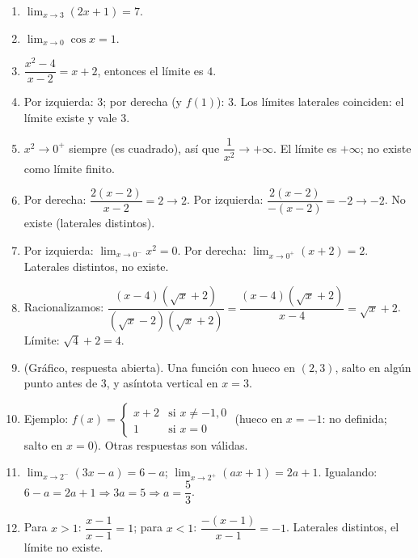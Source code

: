 \documentclass[12pt, a4paper]{article}
\begin{document}
\begin{enumerate}[leftmargin=*, label=\textbf{\arabic*.}]
  \item $\lim_{x \to 3} (2x + 1) = 7$.

  \item $\lim_{x \to 0} \cos x = 1$.

  \item $\dfrac{x^2 - 4}{x - 2} = x + 2$, entonces el límite es $4$.

  \item Por izquierda: $3$; por derecha (y $f(1)$): $3$. Los límites laterales coinciden: el límite existe y vale 3.

  \item $x^2 \to 0^+$ siempre (es cuadrado), así que $\dfrac{1}{x^2} \to +\infty$. El límite es $+\infty$; no existe como límite finito.

  \item Por derecha: $\dfrac{2(x-2)}{x-2} = 2 \to 2$. Por izquierda: $\dfrac{2(x-2)}{-(x-2)} = -2 \to -2$. No existe (laterales distintos).

  \item Por izquierda: $\lim_{x \to 0^-} x^2 = 0$. Por derecha: $\lim_{x \to 0^+} (x + 2) = 2$. Laterales distintos, no existe.

  \item Racionalizamos: $\dfrac{(x - 4)(\sqrt{x} + 2)}{(\sqrt{x} - 2)(\sqrt{x} + 2)} = \dfrac{(x-4)(\sqrt{x}+2)}{x - 4} = \sqrt{x} + 2$. Límite: $\sqrt{4} + 2 = 4$.

  \item (Gráfico, respuesta abierta). Una función con hueco en $(2,3)$, salto en algún punto antes de 3, y asíntota vertical en $x = 3$.

  \item Ejemplo: $f(x) = \begin{cases} x + 2 & \text{si } x \neq -1, 0 \\ 1 & \text{si } x = 0 \end{cases}$ (hueco en $x = -1$: no definida; salto en $x = 0$). Otras respuestas son válidas.

  \item $\lim_{x \to 2^-} (3x - a) = 6 - a$; $\lim_{x \to 2^+} (ax + 1) = 2a + 1$. Igualando: $6 - a = 2a + 1 \Rightarrow 3a = 5 \Rightarrow a = \dfrac{5}{3}$.

  \item Para $x > 1$: $\dfrac{x-1}{x-1} = 1$; para $x < 1$: $\dfrac{-(x-1)}{x-1} = -1$. Laterales distintos, el límite no existe.
\end{enumerate}
\end{document}
